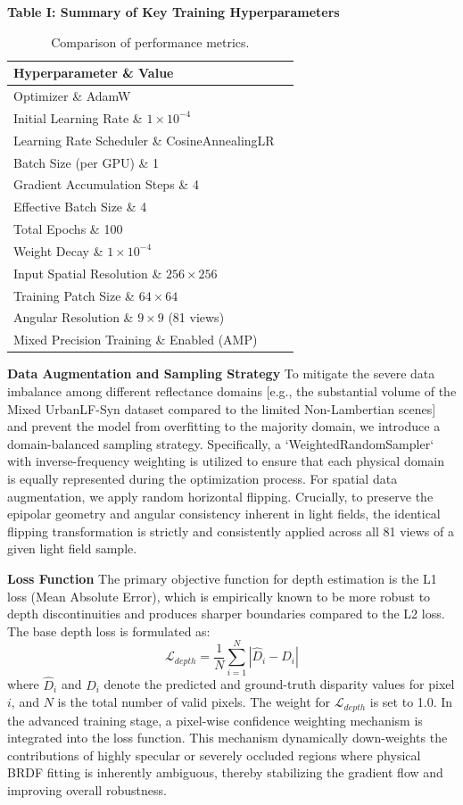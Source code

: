 \documentclass[lettersize,journal]{IEEEtran}
\begin{document}
\textbf{Table I: Summary of Key Training Hyperparameters}
\begin{table}[!t]
\caption{Comparison of performance metrics.}
\label{tab:comparison}
\centering
\begin{tabular}{ll}
\toprule
Hyperparameter \& Value \\
\midrule
Optimizer \& AdamW \\
Initial Learning Rate \& $1 \times 10^{-4}$ \\
Learning Rate Scheduler \& CosineAnnealingLR \\
Batch Size (per GPU) \& 1 \\
Gradient Accumulation Steps \& 4 \\
Effective Batch Size \& 4 \\
Total Epochs \& 100 \\
Weight Decay \& $1 \times 10^{-4}$ \\
Input Spatial Resolution \& $256 \times 256$ \\
Training Patch Size \& $64 \times 64$ \\
Angular Resolution \& $9 \times 9$ (81 views) \\
Mixed Precision Training \& Enabled (AMP) \\
\bottomrule
\end{tabular}
\end{table}
\textbf{Data Augmentation and Sampling Strategy}  
To mitigate the severe data imbalance among different reflectance domains  [e.g., the substantial volume of the Mixed UrbanLF-Syn dataset compared to the limited Non-Lambertian scenes] and prevent the model from overfitting to the majority domain, we introduce a domain-balanced sampling strategy. Specifically, a `WeightedRandomSampler` with inverse-frequency weighting is utilized to ensure that each physical domain is equally represented during the optimization process. For spatial data augmentation, we apply random horizontal flipping. Crucially, to preserve the epipolar geometry and angular consistency inherent in light fields, the identical flipping transformation is strictly and consistently applied across all 81 views of a given light field sample. 

\textbf{Loss Function}  
The primary objective function for depth estimation is the L1 loss (Mean Absolute Error), which is empirically known to be more robust to depth discontinuities and produces sharper boundaries compared to the L2 loss. The base depth loss is formulated as:
\begin{equation}
\label{eq:eq25}
\mathcal{L}_{depth} = \frac{1}{N} \sum_{i=1}^{N} \left| \hat{D}_i - D_i \right|
\end{equation}
where $\hat{D}_i$ and $D_i$ denote the predicted and ground-truth disparity values for pixel $i$, and $N$ is the total number of valid pixels. The weight for $\mathcal{L}_{depth}$ is set to 1.0. In the advanced training stage, a pixel-wise confidence weighting mechanism is integrated into the loss function. This mechanism dynamically down-weights the contributions of highly specular or severely occluded regions where physical BRDF fitting is inherently ambiguous, thereby stabilizing the gradient flow and improving overall robustness.
\end{document}
